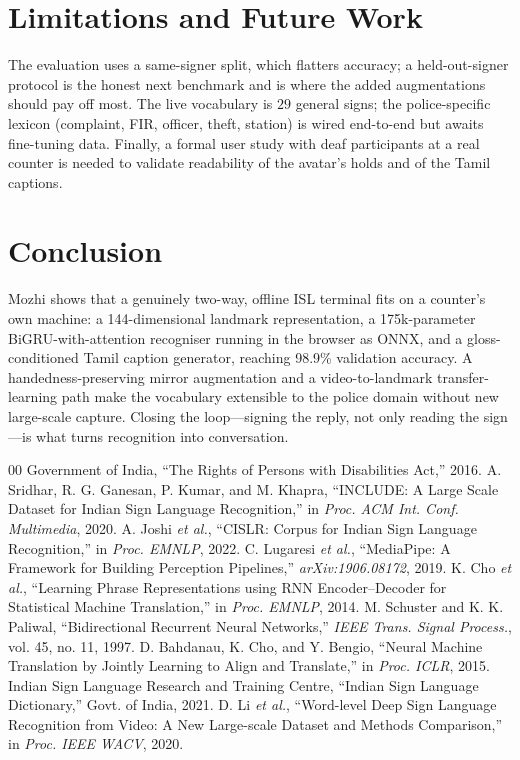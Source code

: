 \documentclass[conference]{IEEEtran}
\begin{document}
\section{Limitations and Future Work}
The evaluation uses a same-signer split, which flatters accuracy; a
held-out-signer protocol is the honest next benchmark and is where the added
augmentations should pay off most. The live vocabulary is $29$ general signs;
the police-specific lexicon (complaint, FIR, officer, theft, station) is wired
end-to-end but awaits fine-tuning data. Finally, a formal user study with deaf
participants at a real counter is needed to validate readability of the avatar's
holds and of the Tamil captions.

\section{Conclusion}
Mozhi shows that a genuinely two-way, offline ISL terminal fits on a counter's
own machine: a 144-dimensional landmark representation, a 175k-parameter
BiGRU-with-attention recogniser running in the browser as ONNX, and a
gloss-conditioned Tamil caption generator, reaching 98.9\% validation accuracy.
A handedness-preserving mirror augmentation and a video-to-landmark
transfer-learning path make the vocabulary extensible to the police domain
without new large-scale capture. Closing the loop---signing the reply, not only
reading the sign---is what turns recognition into conversation.

\begin{thebibliography}{00}
 Government of India, ``The Rights of Persons with Disabilities Act,'' 2016.
 A. Sridhar, R. G. Ganesan, P. Kumar, and M. Khapra, ``INCLUDE: A Large Scale Dataset for Indian Sign Language Recognition,'' in \textit{Proc. ACM Int. Conf. Multimedia}, 2020.
 A. Joshi \textit{et al.}, ``CISLR: Corpus for Indian Sign Language Recognition,'' in \textit{Proc. EMNLP}, 2022.
 C. Lugaresi \textit{et al.}, ``MediaPipe: A Framework for Building Perception Pipelines,'' \textit{arXiv:1906.08172}, 2019.
 K. Cho \textit{et al.}, ``Learning Phrase Representations using RNN Encoder--Decoder for Statistical Machine Translation,'' in \textit{Proc. EMNLP}, 2014.
 M. Schuster and K. K. Paliwal, ``Bidirectional Recurrent Neural Networks,'' \textit{IEEE Trans. Signal Process.}, vol. 45, no. 11, 1997.
 D. Bahdanau, K. Cho, and Y. Bengio, ``Neural Machine Translation by Jointly Learning to Align and Translate,'' in \textit{Proc. ICLR}, 2015.
 Indian Sign Language Research and Training Centre, ``Indian Sign Language Dictionary,'' Govt. of India, 2021.
 D. Li \textit{et al.}, ``Word-level Deep Sign Language Recognition from Video: A New Large-scale Dataset and Methods Comparison,'' in \textit{Proc. IEEE WACV}, 2020.
\end{thebibliography}
\end{document}
